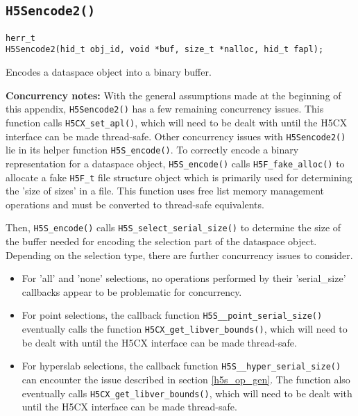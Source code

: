 \documentclass[../HDF5_RFC.tex]{subfiles}
\begin{document}
\subsection{\texttt{H5Sencode2()}}
\label{apdx:h5s_func_h5sencode2}

\begin{verbatim}
herr_t
H5Sencode2(hid_t obj_id, void *buf, size_t *nalloc, hid_t fapl);
\end{verbatim}

Encodes a dataspace object into a binary buffer.

\textbf{Concurrency notes:} With the general assumptions made at the beginning of this
appendix, \texttt{H5Sencode2()} has a few remaining concurrency issues. This function
calls \texttt{H5CX\_set\_apl()}, which will need to be dealt with until the H5CX interface can
be made thread-safe. Other concurrency issues with \texttt{H5Sencode2()} lie in its helper function
\texttt{H5S\_encode()}. To correctly encode a binary representation for a dataspace object,
\texttt{H5S\_encode()} calls \texttt{H5F\_fake\_alloc()} to allocate a fake \texttt{H5F\_t} file
structure object which is primarily used for determining the 'size of sizes' in a file. This
function uses free list memory management operations and must be converted to thread-safe equivalents.

Then, \texttt{H5S\_encode()} calls \texttt{H5S\_select\_serial\_size()} to determine the size of
the buffer needed for encoding the selection part of the dataspace object. Depending on the
selection type, there are further concurrency issues to consider.

\begin{itemize}
    \item For 'all' and 'none' selections, no operations performed by their 'serial\_size' callbacks
          appear to be problematic for concurrency.
    \item For point selections, the callback function \texttt{H5S\_\_point\_serial\_size()} eventually
          calls the function \texttt{H5CX\_get\_libver\_bounds()}, which will need to be dealt with
          until the H5CX interface can be made thread-safe.
    \item For hyperslab selections, the callback function \texttt{H5S\_\_hyper\_serial\_size()} can
          encounter the issue described in section \ref{h5s_op_gen}. The function also eventually
          calls \texttt{H5CX\_get\_libver\_bounds()}, which will need to be dealt with until the H5CX
          interface can be made thread-safe.
\end{itemize}
\end{document}
